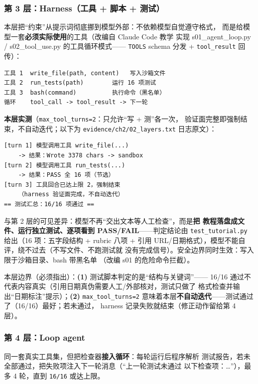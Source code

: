 \subsubsection{第 3 层：Harness（工具 + 脚本 + 测试）}

本层把``约束''从提示词彻底挪到模型外部：不依赖模型自觉遵守格式，
而是给模型一套\textbf{必须实际使用}的工具（改编自 Claude Code 教学
实现 s01\_agent\_loop.py / s02\_tool\_use.py 的工具循环模式——
\texttt{TOOLS} schema 分发 + \texttt{tool\_result} 回传）：

\begin{verbatim}
工具 1  write_file(path, content)   写入沙箱文件
工具 2  run_tests(path)        运行 16 项测试
工具 3  bash(command)          执行命令（黑名单）
循环    tool_call -> tool_result -> 下一轮
\end{verbatim}

\textbf{本层实测}（\texttt{max\_tool\_turns=2}：只允许``写 + 测''各一次，
验证面完整即强制结束，不自动迭代；以下为
\nolinkurl{evidence/ch2/02_layers.txt} 日志原文）：

\begin{verbatim}
[turn 1] 模型调用工具 write_file(...)
    -> 结果：Wrote 3378 chars -> sandbox
[turn 2] 模型调用工具 run_tests(...)
    -> 结果：PASS 全 16 项（节选）
[turn 3] 工具回合已达上限 2，强制结束
    （harness 验证面完成，不自动迭代）
== 测试汇总：16/16 项通过 ==
\end{verbatim}

与第 2 层的可见差异：模型不再``交出文本等人工检查''，而是\textbf{把
教程落盘成文件、运行独立测试、逐项看到 PASS/FAIL}——判定结论由
\texttt{test\_tutorial.py} 给出（16 项：五字段结构 + rubric 八项 +
引用 URL/日期格式），模型不能自评，绕不过去（不写文件、不跑测试就
没有完成信号）。安全边界同时生效：写入限于沙箱目录、bash 带黑名单
（改编 s01 的危险命令拦截）。

本层边界（必须指出）：\textbf{(1)} 测试脚本判定的是``结构与关键词''——
16/16 通过不代表内容真实（引用日期真伪需要人工/外部核对，测试只做了
格式检查并输出``日期标注''提示）；\textbf{(2)} \texttt{max\_tool\_turns=2}
意味着本层\textbf{不自动迭代}——测试通过了（16/16）最好；若未通过，
harness 记录失败就结束（修正动作留给第 4 层）。

\subsubsection{第 4 层：Loop agent}

同一套真实工具集，但把检查器\textbf{接入循环}：每轮运行后程序解析
测试报告，若未全部通过，把失败项注入下一轮消息（``上一轮测试未通过
以下检查项：…''），最多 4 轮，直到 \texttt{16/16} 或达上限。

